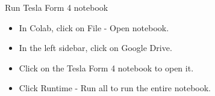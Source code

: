 \documentclass[10pt]{beamer}
\begin{document}
\begin{frame}{Run Tesla Form 4 notebook}
    \begin{itemize}
        \item In Colab, click on File - Open notebook.
        \item In the left sidebar, click on Google Drive.
        \item Click on the Tesla Form 4 notebook to open it.
        \item  Click Runtime - Run all to run the entire notebook.
    \end{itemize}
\end{frame}
\end{document}
